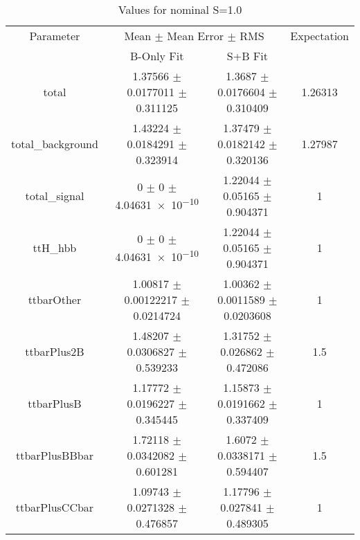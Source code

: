 \begin{table}
\centering
\caption{Values for nominal S=1.0}
\begin{tabular}{cccc}
\toprule
Parameter & \multicolumn{2}{c}{Mean $\pm$ Mean Error $\pm$ RMS} & Expectation\\
 & B-Only Fit & S+B Fit & \\
\midrule
total & \num{1.37566} $\pm$ \num{0.0177011} $\pm$ \num{0.311125} & \num{1.3687} $\pm$ \num{0.0176604} $\pm$ \num{0.310409} & \num{1.26313}\\
total\_background & \num{1.43224} $\pm$ \num{0.0184291} $\pm$ \num{0.323914} & \num{1.37479} $\pm$ \num{0.0182142} $\pm$ \num{0.320136} & \num{1.27987}\\
total\_signal & \num{0} $\pm$ \num{0} $\pm$ \num{4.04631e-10} & \num{1.22044} $\pm$ \num{0.05165} $\pm$ \num{0.904371} & \num{1}\\
ttH\_hbb & \num{0} $\pm$ \num{0} $\pm$ \num{4.04631e-10} & \num{1.22044} $\pm$ \num{0.05165} $\pm$ \num{0.904371} & \num{1}\\
ttbarOther & \num{1.00817} $\pm$ \num{0.00122217} $\pm$ \num{0.0214724} & \num{1.00362} $\pm$ \num{0.0011589} $\pm$ \num{0.0203608} & \num{1}\\
ttbarPlus2B & \num{1.48207} $\pm$ \num{0.0306827} $\pm$ \num{0.539233} & \num{1.31752} $\pm$ \num{0.026862} $\pm$ \num{0.472086} & \num{1.5}\\
ttbarPlusB & \num{1.17772} $\pm$ \num{0.0196227} $\pm$ \num{0.345445} & \num{1.15873} $\pm$ \num{0.0191662} $\pm$ \num{0.337409} & \num{1}\\
ttbarPlusBBbar & \num{1.72118} $\pm$ \num{0.0342082} $\pm$ \num{0.601281} & \num{1.6072} $\pm$ \num{0.0338171} $\pm$ \num{0.594407} & \num{1.5}\\
ttbarPlusCCbar & \num{1.09743} $\pm$ \num{0.0271328} $\pm$ \num{0.476857} & \num{1.17796} $\pm$ \num{0.027841} $\pm$ \num{0.489305} & \num{1}\\
\bottomrule
\end{tabular}
\end{table}